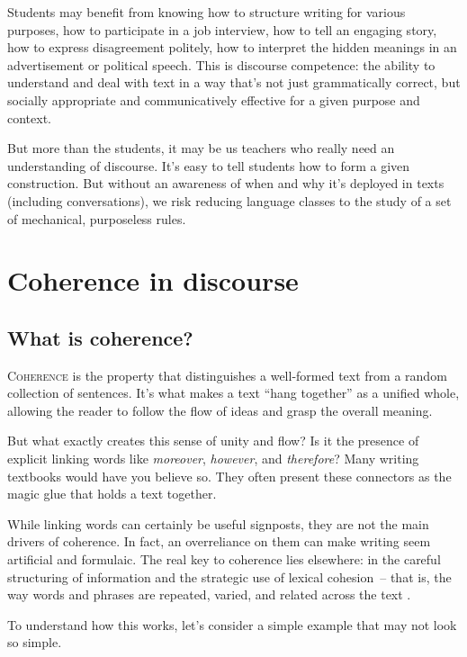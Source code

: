Students may benefit from knowing how to structure writing for various purposes, how to participate in a job interview, how to tell an engaging story, how to express disagreement politely, how to interpret the hidden meanings in an advertisement or political speech. This is discourse competence: the ability to understand and deal with text in a way that's not just grammatically correct, but socially appropriate and communicatively effective for a given purpose and context.

But more than the students, it may be us teachers who really need an understanding of discourse. It's easy to tell students how to form a given construction. But without an awareness of when and why it's deployed in texts (including conversations), we risk reducing language classes to the study of a set of mechanical, purposeless rules.

\section{Coherence in discourse}

\subsection{What is coherence?}

\textsc{Coherence} is the property that distinguishes a well-formed text from a random collection of sentences. It's what makes a text ``hang together'' as a unified whole, allowing the reader to follow the flow of ideas and grasp the overall meaning. 

But what exactly creates this sense of unity and flow? Is it the presence of explicit linking words like \textit{moreover}, \textit{however}, and \textit{therefore}? Many writing textbooks would have you believe so. They often present these connectors as the magic glue that holds a text together.

While linking words can certainly be useful signposts, they are not the main drivers of coherence. In fact, an overreliance on them can make writing seem artificial and formulaic. The real key to coherence lies elsewhere: in the careful structuring of information and the strategic use of lexical cohesion~-- that is, the way words and phrases are repeated, varied, and related across the text \citep{HallidayHasan1976}.

To understand how this works, let's consider a simple example that may not look so simple.

